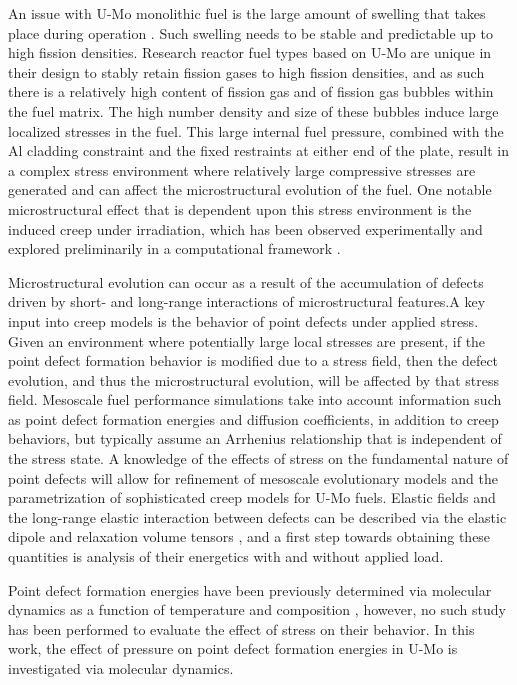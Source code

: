 \documentclass[default]{sn-jnl}%
\begin{document}
An issue with U-Mo monolithic fuel is the large amount of swelling that takes place during operation \cite{hofman1997}. Such swelling needs to be stable and predictable up to high fission densities. Research reactor fuel types based on U-Mo are unique in their design to stably retain fission gases to high fission densities, and as such there is a relatively high content of fission gas and of fission gas bubbles within the fuel matrix. The high number density and size of these bubbles induce large localized stresses in the fuel. This large internal fuel pressure, combined with the Al cladding constraint and the fixed restraints at either end of the plate, result in a complex stress environment where relatively large compressive stresses are generated and can affect the microstructural evolution of the fuel. One notable microstructural effect that is dependent upon this stress environment is the induced creep under irradiation, which has been observed experimentally \cite{kim2013} and explored preliminarily in a computational framework \cite{xmiao2021, xjian2019}. 

Microstructural evolution can occur as a result of the accumulation of defects driven by short- and long-range interactions of microstructural features.A key input into creep models is the behavior of point defects under applied stress. Given an environment where potentially large local stresses are present, if the point defect formation behavior is modified due to a stress field, then the defect evolution, and thus the microstructural evolution, will be affected by that stress field. Mesoscale fuel performance simulations \cite{ye2018, hu2017a, dudarev2010} take into account information such as point defect formation energies and diffusion coefficients, in addition to creep behaviors, but typically assume an Arrhenius relationship that is independent of the stress state. A knowledge of the effects of stress on the fundamental nature of point defects will allow for refinement of mesoscale evolutionary models and the parametrization of sophisticated creep models for U-Mo fuels. Elastic fields and the long-range elastic interaction between defects can be described via the elastic dipole and relaxation volume tensors \cite{freysoldt2014, bacon1980}, and a first step towards obtaining these quantities is analysis of their energetics with and without applied load.

Point defect formation energies have been previously determined via molecular dynamics as a function of temperature and composition \cite{park2021}, however, no such study has been performed to evaluate the effect of stress on their behavior. In this work, the effect of pressure on point defect formation energies in U-Mo is investigated via molecular dynamics. 
\end{document}
